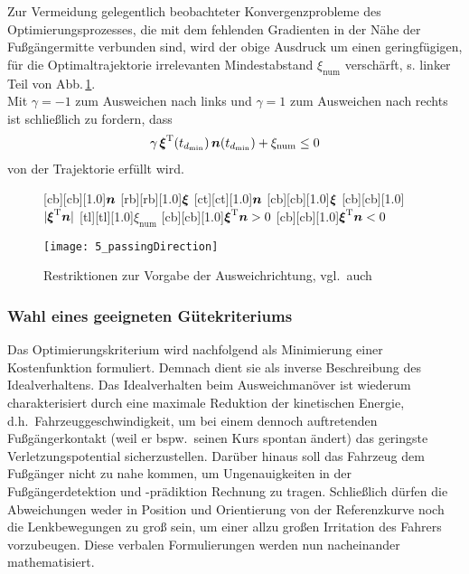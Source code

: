 Zur Vermeidung gelegentlich beobachteter Konvergenzprobleme des Optimierungsprozesses, die mit dem fehlenden Gradienten in der Nähe der Fußgängermitte verbunden sind, wird der obige Ausdruck um einen geringfügigen, für die Optimaltrajektorie irrelevanten Mindestabstand $\xi_{\text{num}}$ verschärft, s. linker Teil von Abb.\,\ref{fig:skalarProduct}.  \\
Mit  $\gamma = -1$ zum Ausweichen nach links und $\gamma = 1$ zum Ausweichen nach rechts ist schließlich zu fordern, dass
\begin{align*}
\gamma \, \boldsymbol{\xi}^{{\rm T}}(t_{d_{\min}}) \, \boldsymbol{n}(t_{d_{\min}}) + \xi_{\text{num}} \leq 0
\end{align*}
von der Trajektorie erfüllt wird.


\begin{figure}[h]
        [cb][cb][1.0]{$\boldsymbol{n}$}
        [rb][rb][1.0]{$\boldsymbol{\xi}$}
        [ct][ct][1.0]{$\boldsymbol{n}$}
        [cb][cb][1.0]{$\boldsymbol{\xi}$}
        [cb][cb][1.0]{$|\boldsymbol{\xi}^{{\rm T}} \boldsymbol{n}|$}
        [tl][tl][1.0]{$\xi_\text{num}$}
        [cb][cb][1.0]{$\boldsymbol{\xi}^{{\rm T}} \boldsymbol{n} \stackrel{}{>} 0$}
        [cb][cb][1.0]{$\boldsymbol{\xi}^{{\rm T}} \boldsymbol{n} \stackrel{}{<} 0$}
    \begin{center}
    \texttt{[image: 5\_passingDirection]}
    \caption[Restriktionen zur Vorgabe der Ausweichrichtung]{Restriktionen zur Vorgabe der Ausweichrichtung, vgl.\ auch \cite{gerdts2009generating}}
    \label{fig:skalarProduct}
    \end{center}
\end{figure}

\subsubsection{Wahl eines geeigneten Gütekriteriums} \label{sec:costs}
Das Optimierungskriterium wird nachfolgend als Minimierung einer Kostenfunktion formuliert. Demnach dient sie als inverse Beschreibung des Idealverhaltens. Das Idealverhalten beim Ausweichmanöver ist wiederum charakterisiert durch eine maximale Reduktion der kinetischen Energie, d.h.\ Fahrzeuggeschwindigkeit, um bei einem dennoch auftretenden Fußgängerkontakt (weil er bspw.\ seinen Kurs spontan ändert) das geringste Verletzungspotential sicherzustellen. Darüber hinaus soll das Fahrzeug dem Fußgänger nicht zu nahe kommen, um Ungenauigkeiten in der Fußgängerdetektion und -prädiktion Rechnung zu tragen. Schließlich dürfen die Abweichungen weder in Position und Orientierung von der Referenzkurve noch die Lenkbewegungen zu groß sein, um einer allzu großen Irritation des Fahrers vorzubeugen. Diese verbalen Formulierungen werden nun nacheinander mathematisiert.

